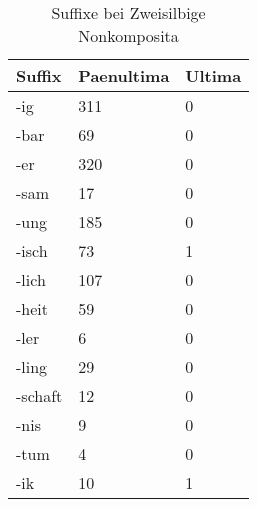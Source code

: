 \begin{table}[h]
\centering
\caption{Suffixe bei Zweisilbige Nonkomposita}
\begin{tabular}{|l|l|l|}
\hline
{\bf Suffix} & {\bf Paenultima} & {\bf Ultima} \\ \hline
-ig           & 311              & 0            \\ \hline
-bar          & 69               & 0            \\ \hline
-er           & 320              & 0            \\ \hline
-sam          & 17               & 0            \\ \hline
-ung          & 185              & 0            \\ \hline
-isch         & 73               & 1            \\ \hline
-lich         & 107              & 0            \\ \hline
-heit         & 59               & 0            \\ \hline
-ler          & 6                & 0            \\ \hline
-ling         & 29               & 0            \\ \hline
-schaft       & 12               & 0            \\ \hline
-nis          & 9                & 0            \\ \hline
-tum          & 4                & 0            \\ \hline
-ik           & 10               & 1            \\ \hline
\end{tabular}
\end{table}